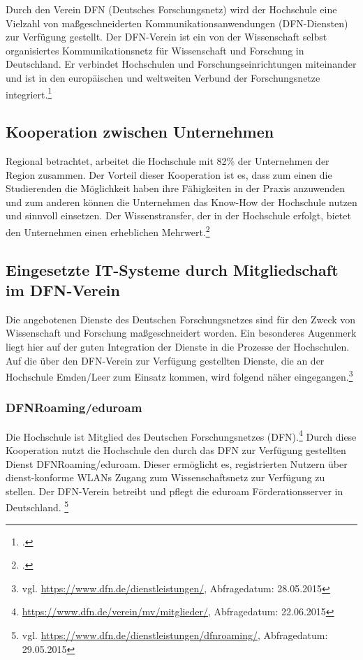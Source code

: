 Durch den Verein DFN (Deutsches Forschungsnetz) wird der Hochschule eine Vielzahl von maßgeschneiderten Kommunikationsanwendungen (DFN-Diensten) zur Verfügung gestellt. Der DFN-Verein ist ein von der Wissenschaft selbst organisiertes Kommunikationsnetz für Wissenschaft und Forschung in Deutschland. Er verbindet Hochschulen und Forschungseinrichtungen miteinander und ist in den europäischen und weltweiten  Verbund der Forschungsnetze integriert.\footcite[Vgl.][]{dfn_home_2015}

\subsection{Kooperation zwischen Unternehmen}
Regional betrachtet, arbeitet die Hochschule mit 82\% der Unternehmen der Region zusammen. Der Vorteil dieser Kooperation ist es, dass zum einen die Studierenden die Möglichkeit haben ihre Fähigkeiten in der Praxis anzuwenden und zum anderen können die Unternehmen das Know-How  der Hochschule nutzen und sinnvoll einsetzen. Der Wissenstransfer, der in der Hochschule erfolgt, bietet den Unternehmen einen erheblichen Mehrwert.\footcite[Vgl.][]{hsel_artikel_kooperation_unternehmen_2014}

\subsection{Eingesetzte IT-Systeme durch Mitgliedschaft im DFN-Verein}
Die angebotenen Dienste des Deutschen Forschungsnetzes sind für den Zweck von Wissenschaft und Forschung maßgeschneidert worden. Ein besonderes Augenmerk liegt hier auf der guten Integration der Dienste in die Prozesse der Hochschulen.  Auf die über den DFN-Verein zur Verfügung gestellten Dienste, die an der Hochschule Emden/Leer zum Einsatz kommen, wird folgend näher eingegangen.\footnote{vgl. \url{https://www.dfn.de/dienstleistungen/}, Abfragedatum: 28.05.2015}

\subsubsection{DFNRoaming/eduroam}
Die Hochschule ist Mitglied des Deutschen Forschungsnetzes (DFN).\footnote{\url{https://www.dfn.de/verein/mv/mitglieder/}, Abfragedatum: 22.06.2015} Durch diese Kooperation nutzt die Hochschule den durch das DFN zur Verfügung gestellten Dienst DFNRoaming/eduroam. Dieser ermöglicht es, registrierten Nutzern über dienst-konforme WLANs Zugang zum Wissenschaftsnetz zur Verfügung zu stellen. Der DFN-Verein betreibt und pflegt die eduroam Förderationsserver in Deutschland. \footnote{vgl. \url{https://www.dfn.de/dienstleistungen/dfnroaming/}, Abfragedatum: 29.05.2015} 

